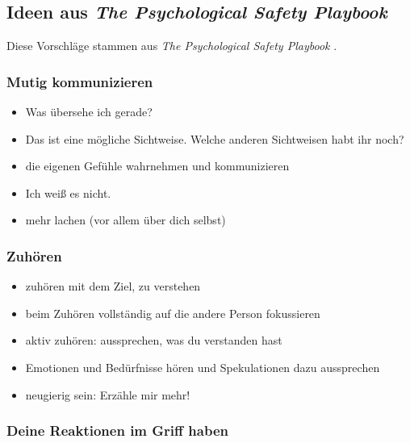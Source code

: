 \subsection{Ideen aus \emph{The Psychological Safety Playbook}}

Diese Vorschläge stammen aus \emph{The Psychological Safety Playbook} \cite{psychological-safety-playbook}.


\subsubsection{Mutig kommunizieren}

\begin{itemize}
  \item \glqq Was übersehe ich gerade?\grqq
  \item \glqq Das ist eine mögliche Sichtweise. Welche anderen Sichtweisen habt ihr noch?\grqq
  \item die eigenen Gefühle wahrnehmen und kommunizieren 
  \item \glqq Ich weiß es nicht.\grqq
  \item mehr lachen (vor allem über dich selbst) 
\end{itemize}



\subsubsection{Zuhören}

\begin{itemize}
  \item zuhören mit dem Ziel, zu verstehen
  \item beim Zuhören vollständig auf die andere Person fokussieren
  \item aktiv zuhören: aussprechen, was du verstanden hast 
  \item Emotionen und Bedürfnisse hören und Spekulationen dazu aussprechen 
  \item neugierig sein: \glqq Erzähle mir mehr!\grqq {}
\end{itemize}


\subsubsection{Deine Reaktionen im Griff haben}

